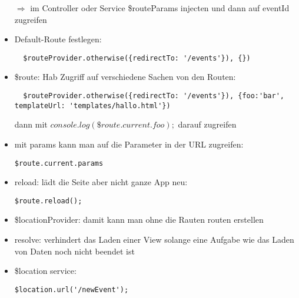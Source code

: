 \begin{itemize}
$\Rightarrow$  im Controller oder Service \$routeParams injecten und dann auf eventId zugreifen
  \item Default-Route festlegen:
\begin{verbatim}
  $routeProvider.otherwise({redirectTo: '/events'}), {})
\end{verbatim}
  \item \$route: Hab Zugriff auf verschiedene Sachen von den Routen:
\begin{verbatim}
  $routeProvider.otherwise({redirectTo: '/events'}), {foo:'bar', templateUrl: 'templates/hallo.html'})
\end{verbatim}
dann mit $console.log(\$route.current.foo);$ darauf zugreifen
  \item mit params kann man auf die Parameter in der URL zugreifen:
\begin{verbatim}
$route.current.params
\end{verbatim}
  \item reload: lädt die Seite aber nicht ganze App neu:
    \begin{verbatim}
$route.reload();
    \end{verbatim}
  \item \$locationProvider: damit kann man ohne die Rauten routen erstellen
  \item resolve: verhindert das Laden einer View solange eine Aufgabe wie das Laden von Daten noch
    nicht beendet ist
  \item \$location service:
    \begin{verbatim}
$location.url('/newEvent');
    \end{verbatim}
\end{itemize}


